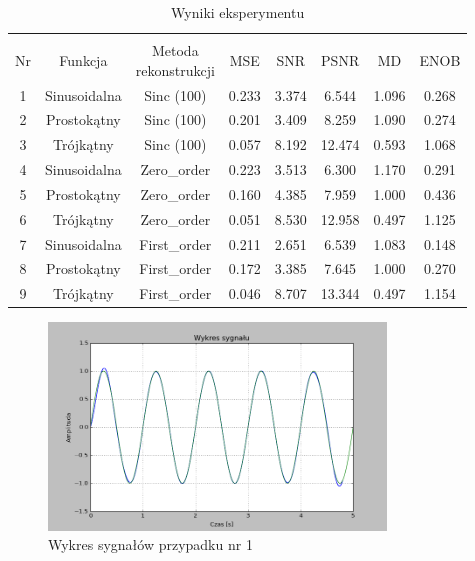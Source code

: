 \documentclass{article}
\begin{document}
    \begin{table}[h!]
        \centering
        \vspace{0.2cm}
        \begin{tabular}{|c|c|c|c|c|c|c|c|}
            \hline\hline\\[-0.4cm]
            Nr & Funkcja & \shortstack{Metoda\\ rekonstrukcji} & MSE & SNR & PSNR & MD & ENOB  \\
            \hline
            1 & Sinusoidalna & Sinc (100) & 0.233 & 3.374 & 6.544 & 1.096 & 0.268  \\
            \hline
            2 & Prostokątny & Sinc (100) & 0.201 & 3.409 & 8.259 & 1.090 & 0.274   \\
            \hline
            3 & Trójkątny & Sinc (100) & 0.057 & 8.192 & 12.474 & 0.593 & 1.068   \\
            \hline
            4 & Sinusoidalna & Zero\_order & 0.223 & 3.513 & 6.300 & 1.170 & 0.291  \\
            \hline
            5 & Prostokątny & Zero\_order & 0.160 & 4.385 & 7.959 & 1.000 & 0.436   \\
            \hline
            6 & Trójkątny & Zero\_order & 0.051 & 8.530 & 12.958 & 0.497 & 1.125   \\
            \hline
            7 & Sinusoidalna & First\_order & 0.211 & 2.651 & 6.539 & 1.083 & 0.148    \\
            \hline
            8 & Prostokątny & First\_order & 0.172 & 3.385 & 7.645 & 1.000 & 0.270   \\
            \hline
            9 & Trójkątny & First\_order & 0.046 & 8.707 & 13.344 & 0.497 & 1.154   \\
            \hline
        \end{tabular}
        \caption{Wyniki eksperymentu}
    \end{table}
    \FloatBarrier

    \begin{figure}[h!]
        \centering
        \includegraphics[width=0.8\textwidth]{img/1/sinc5.png}
        \caption{Wykres sygnałów przypadku nr 1}
    \end{figure}
    \FloatBarrier
\end{document}
